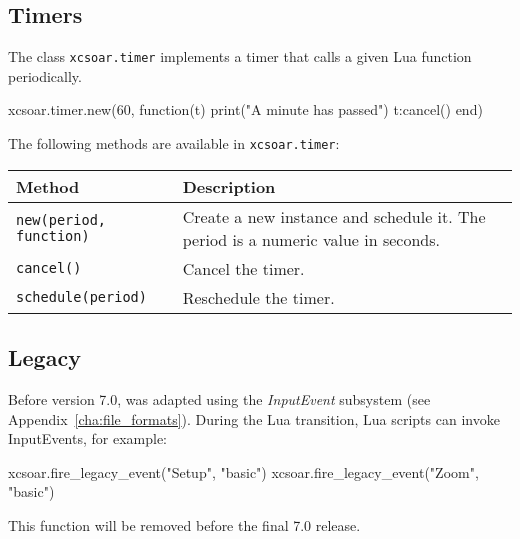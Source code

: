 \subsection{Timers}

The class \verb|xcsoar.timer| implements a timer that calls a given
Lua function periodically.

\begin{lua}
xcsoar.timer.new(60, function(t)
  print("A minute has passed")
  t:cancel()
end)
\end{lua}

The following methods are available in \verb|xcsoar.timer|:

\begin{maxipage}
\begin{tabularx}{1.9\textwidth}{l|X}
Method & Description \\
\hline\hline

\verb|new(period, function)| & Create a new instance and schedule
it.  The period is a numeric value in seconds. \\

\hline

\verb|cancel()| & Cancel the timer. \\

\hline

\verb|schedule(period)| & Reschedule the timer. \\

\end{tabularx}
\end{maxipage}

\subsection{Legacy}

Before version 7.0, \xc was adapted using the \emph{InputEvent}
subsystem (see Appendix~\ref{cha:file_formats}).  During the Lua
transition, Lua scripts can invoke InputEvents, for example:

\begin{lua}
xcsoar.fire_legacy_event("Setup", "basic")
xcsoar.fire_legacy_event("Zoom", "basic")
\end{lua}

This function will be removed before the final 7.0 release.
